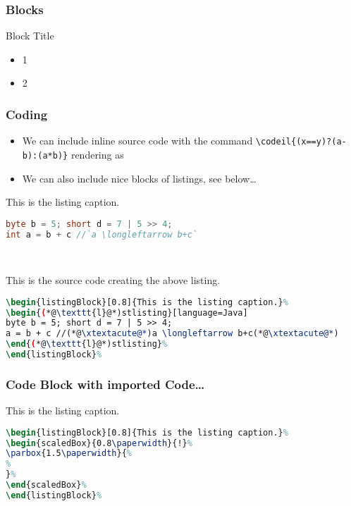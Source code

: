 \documentclass[mathserif]{beamer}%
\begin{document}
%
\begin{frame}%
\frametitle{Blocks}%
\begin{block}{Block Title}%
\begin{itemize}%
\item 1%
\item 2%
\end{itemize}%
\end{block}%
\end{frame}%
%
\begin{frame}[containsverbatim]%
\frametitle{Coding}%
\begin{itemize}%
\item We can include inline source code with the command \texttt{{\textbackslash}codeil\{(x==y)?(a-b):(a*b)\}} rendering as %
\item We can also include nice blocks of listings, see below\dots%
\end{itemize}%
\begin{center}%
\begin{listingBlock}[0.8]{This is the listing caption.}%
\begin{lstlisting}[language=Java]
byte b = 5; short d = 7 | 5 >> 4;
int a = b + c //`a \longleftarrow b+c`
\end{lstlisting}%
\end{listingBlock}\\%
\def\xtextacute{\texttt{\` }}%
\begin{listingBlock}[0.8]{This is the source code creating the above listing.}%
\begin{lstlisting}[language=TeX]
\begin{listingBlock}[0.8]{This is the listing caption.}%
\begin{(*@\texttt{l}@*)stlisting}[language=Java]
byte b = 5; short d = 7 | 5 >> 4;
a = b + c //(*@\xtextacute@*)a \longleftarrow b+c(*@\xtextacute@*)
\end{(*@\texttt{l}@*)stlisting}%
\end{listingBlock}%
\end{lstlisting}%
\end{listingBlock}%
\end{center}%
\end{frame}%
%
%
\begin{frame}[containsverbatim]%
\frametitle{Code Block with imported Code\dots}%
\begin{center}%
\begin{listingBlock}[0.9]{This is the listing caption.}%
\begin{lstlisting}[language=TeX]
\begin{listingBlock}[0.8]{This is the listing caption.}%
\begin{scaledBox}{0.8\paperwidth}{!}%
\parbox{1.5\paperwidth}{%
%
}%
\end{scaledBox}%
\end{listingBlock}%
\end{lstlisting}%
\end{listingBlock}%
\end{center}%
\end{frame}%
\end{document}
